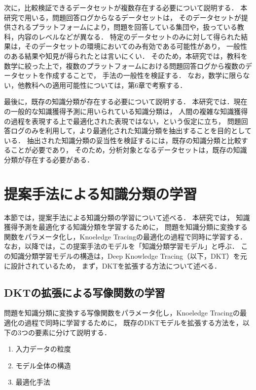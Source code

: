 次に，比較検証できるデータセットが複数存在する必要について説明する．
本研究で用いる，問題回答ログからなるデータセットは，
そのデータセットが提供されるプラットフォームにより，問題を回答している集団や，扱っている教科，内容のレベルなどが異なる．
特定のデータセットのみに対して得られた結果は，そのデータセットの環境においてのみ有効である可能性があり，
一般性のある結果や知見が得られたとは言いにくい．
そのため，本研究では，教科を数学に絞った上で，複数のプラットフォームにおける問題回答ログから複数のデータセットを作成することで，
手法の一般性を検証する．
なお，数学に限らない，他教科への適用可能性については，第6章で考察する．


最後に，既存の知識分類が存在する必要について説明する．
本研究では．現在の一般的な知識獲得予測に用いられている知識分類は，
人間の複雑な知識獲得の過程を表現する上で最適化された表現ではない，という仮定に立ち，
問題回答ログのみを利用して，より最適化された知識分類を抽出することを目的としている．
抽出された知識分類の妥当性を検証するには，既存の知識分類と比較することが必要であり，
そのため，分析対象となるデータセットは，既存の知識分類が存在する必要がある．





\section{提案手法による知識分類の学習}
本節では，提案手法による知識分類の学習について述べる．
本研究では，
知識獲得予測を最適化する知識分類を学習するために，
問題を知識分類に変換する関数をパラメータ化し，Knoeledge Tracingの最適化の過程で同時に学習する．
なお，以降では，この提案手法のモデルを「知識分類学習モデル」と呼ぶ．
この知識分類学習モデルの構造は，Deep Knowledge Tracing（以下，DKT）を元に設計されているため，
まず，DKTを拡張する方法について述べる．



\subsection{DKTの拡張による写像関数の学習}
\label{sec:tag_learn}

問題を知識分類に変換する写像関数をパラメータ化し，Knoeledge Tracingの最適化の過程で同時に学習するために，
既存のDKTモデルを拡張する方法を，以下の3つの要素に分けて説明する．

\begin{enumerate}
	\item 入力データの粒度
	\item モデル全体の構造
	\item 最適化手法
\end{enumerate}


